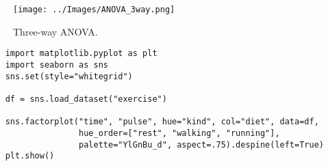 \begin{figure}
  \centering
  \texttt{[image: ../Images/ANOVA\_3way.png]}\\
  \caption{Three-way ANOVA.}\label{fig:ANOVA3way}
\end{figure}

\begin{lstlisting}
    import matplotlib.pyplot as plt
    import seaborn as sns
    sns.set(style="whitegrid")

    df = sns.load_dataset("exercise")

    sns.factorplot("time", "pulse", hue="kind", col="diet", data=df,
                   hue_order=["rest", "walking", "running"],
                   palette="YlGnBu_d", aspect=.75).despine(left=True)
    plt.show()
\end{lstlisting}


